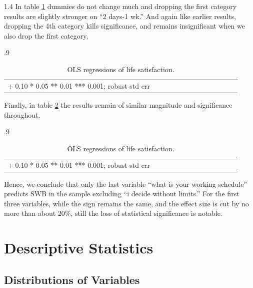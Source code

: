 \documentclass[10pt, letterpaper]{article}
\begin{document}
\begin{spacing}{1.4}
In table \ref{c5} dummies do not change much and dropping the first category
results are slightly stronger on ``2 days-1 wk.'' And again like earlier results,
dropping the 4th category kills significance, and remains insignificant when we
also drop the first category.  

\begin{spacing}{.9} \begin{table}[H]\centering   \begin{scriptsize} \begin{tabular}{p{1.8in}p{.5in}p{.5in}p{.5in}p{.5in}p{.5in}p{.5in}p{.5in}p{.5in}p{.5in}p{.5 in}p{.5in}p{.5 in}}\hline  \hline + 0.10 * 0.05 ** 0.01 *** 0.001; robust std err \end{tabular}\end{scriptsize}\caption{\label{c5}OLS regressions of life satisfaction.}\end{table} \end{spacing}

Finally, in table \ref{d5} the results remain of similar magnitude and significance throughout.

\begin{spacing}{.9} \begin{table}[H]\centering   \begin{scriptsize} \begin{tabular}{p{1.8in}p{.5in}p{.5in}p{.5in}p{.5in}p{.5in}p{.5in}p{.5in}p{.5in}p{.5in}p{.5 in}p{.5in}p{.5 in}}\hline  \hline + 0.10 * 0.05 ** 0.01 *** 0.001; robust std err \end{tabular}\end{scriptsize}\caption{\label{d5}OLS regressions of life satisfaction.}\end{table} \end{spacing}

Hence, we conclude that only the last variable ``what is your working schedule''
 predicts SWB in the sample excluding ``i decide without limits.'' For the first three
 variables, while the sign remains the same, and the effect size is cut by no more than about 20\%, still the loss of statistical significance is notable. 



\section{Descriptive Statistics}

\subsection{Distributions of Variables}


\end{spacing}
\end{document}
